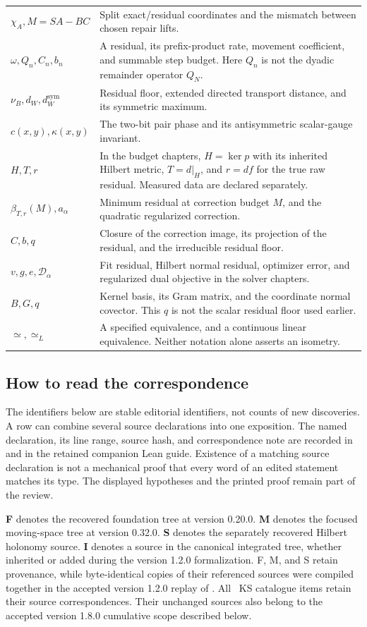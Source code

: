 \begin{longtable}{@{}p{.25\linewidth}p{.7\linewidth}@{}}
\(\chi_A,M=SA-BC\) & Split exact/residual coordinates and the mismatch between chosen repair lifts.\\
\(\omega,Q_n,C_n,b_n\) & A residual, its prefix-product rate, movement coefficient, and summable step budget. Here $Q_n$ is not the dyadic remainder operator $Q_N$.\\
\(\nu_B,d_W,d_W^{\mathrm{sym}}\) & Residual floor, extended directed transport distance, and its symmetric maximum.\\
\(c(x,y),\kappa(x,y)\) & The two-bit pair phase and its antisymmetric scalar-gauge invariant.\\
\(H,T,r\) & In the budget chapters, $H=\ker p$ with its inherited Hilbert metric, $T=d|_H$, and $r=df$ for the true raw residual. Measured data are declared separately.\\
\(\beta_{T,r}(M),a_\alpha\) & Minimum residual at correction budget $M$, and the quadratic regularized correction.\\
\(C,b,q\) & Closure of the correction image, its projection of the residual, and the irreducible residual floor.\\
\(v,g,e,\mathcal D_\alpha\) & Fit residual, Hilbert normal residual, optimizer error, and regularized dual objective in the solver chapters.\\
\(B,G,q\) & Kernel basis, its Gram matrix, and the coordinate normal covector. This $q$ is not the scalar residual floor used earlier.\\
\(\simeq,\simeq_L\) & A specified equivalence, and a continuous linear equivalence. Neither notation alone asserts an isometry.\\
\bottomrule
\end{longtable}

\subsection{How to read the correspondence}
The identifiers below are stable editorial identifiers, not counts of new discoveries. A row can combine several source declarations into one exposition. The named declaration, its line range, source hash, and correspondence note are recorded in  and in the retained companion Lean guide. Existence of a matching source declaration is not a mechanical proof that every word of an edited statement matches its type. The displayed hypotheses and the printed proof remain part of the review.

\textbf{F} denotes the recovered foundation tree at version 0.20.0. \textbf{M} denotes the focused moving-space tree at version 0.32.0. \textbf{S} denotes the separately recovered Hilbert holonomy source. \textbf{I} denotes a source in the canonical integrated tree, whether inherited or added during the version 1.2.0 formalization. F, M, and S retain provenance, while byte-identical copies of their referenced sources were compiled together in the accepted version 1.2.0 replay of . All \EditionClaims\ KS catalogue items retain their source correspondences. Their unchanged sources also belong to the accepted version 1.8.0 cumulative scope described below.

